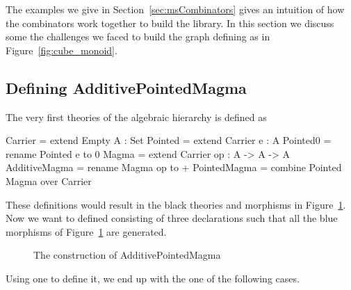 The examples we give in Section~\ref{sec:msCombinators} gives an intuition of how the combinators work together to build the library. In this section we discuss some the challenges we faced to build the graph defining  as in Figure~\ref{fig:cube_monoid}.  

\subsection{Defining AdditivePointedMagma}
The very first theories of the algebraic hierarchy is defined as 
\begin{togcode} 
Carrier = extend Empty {A : Set}
Pointed = extend Carrier {e : A}
Pointed0 = rename Pointed {e to 0} 
Magma = extend Carrier {op : A -> A -> A}
AdditiveMagma = rename Magma {op to +} 
PointedMagma = combine Pointed {} Magma {} over Carrier
\end{togcode} 
These definitions would result in the black theories and morphisms in Figure~\ref{fig:addPointedMagma}. Now we want to defined  consisting of three declarations  such that all the blue morphisms of 
Figure~\ref{fig:addPointedMagma} are generated. 
\begin{figure}[h]
    \caption{The construction of AdditivePointedMagma}
    \label{fig:addPointedMagma}
\end{figure}
Using one  to define it, we end up with the one of the following cases. 
